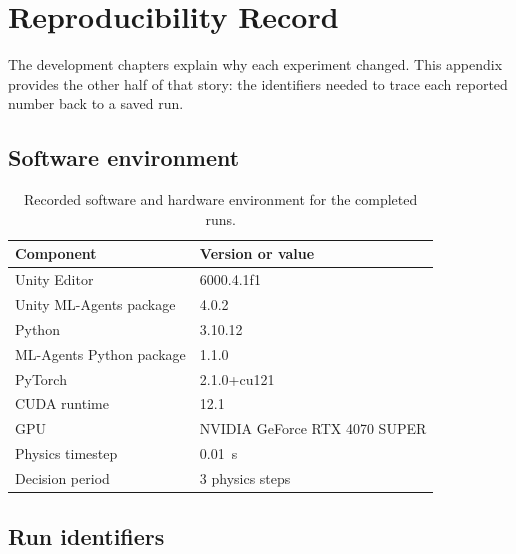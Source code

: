 \chapter{Reproducibility Record}
\label{app:reproducibility}

The development chapters explain why each experiment changed. This appendix provides the other
half of that story: the identifiers needed to trace each reported number back to a saved run.

\section{Software environment}

\begin{table}[htbp]
  \centering
  \caption{Recorded software and hardware environment for the completed runs.}
  \begin{tabular}{ll}
    \toprule
    Component & Version or value \\
    \midrule
    Unity Editor & 6000.4.1f1 \\
    Unity ML-Agents package & 4.0.2 \\
    Python & 3.10.12 \\
    ML-Agents Python package & 1.1.0 \\
    PyTorch & 2.1.0+cu121 \\
    CUDA runtime & 12.1 \\
    GPU & NVIDIA GeForce RTX 4070 SUPER \\
    Physics timestep & \SI{0.01}{s} \\
    Decision period & 3 physics steps \\
    \bottomrule
  \end{tabular}
\end{table}

\section{Run identifiers}

